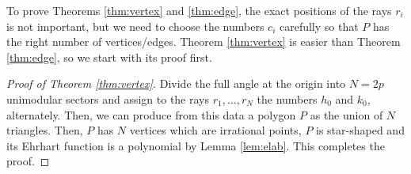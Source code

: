 \documentclass[a4paper]{article}
\begin{document}
To prove Theorems \ref{thm:vertex} and \ref{thm:edge}, the exact positions of the rays $r_i$ is not important, but we need to choose the numbers $c_i$ carefully so that $P$ has the right number of vertices/edges. Theorem \ref{thm:vertex} is easier than Theorem \ref{thm:edge}, so we start with its proof first.

\begin{proof}[Proof of Theorem \ref{thm:vertex}]
	Divide the full angle at the origin into $N = 2p$ unimodular sectors and assign to the rays $r_1, \dots, r_{N}$ the numbers $h_0$ and $k_0$, alternately. Then, we can produce from this data a polygon $P$ as the union of $N$ triangles. Then, $P$ has $N$ vertices which are irrational points, $P$ is star-shaped and its Ehrhart function is a polynomial by Lemma \ref{lem:elab}. This completes the proof.
\end{proof}
\end{document}
